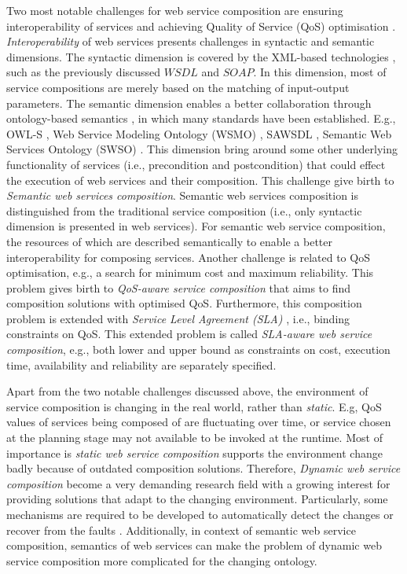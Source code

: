 Two most notable challenges for web service composition are ensuring interoperability of services and achieving Quality of Service (QoS) optimisation \cite{fensel2011semantic}. \emph{Interoperability} of web services presents challenges in syntactic and semantic dimensions. The syntactic dimension is covered by the XML-based technologies \cite{yu2008deploying}, such as the previously discussed $WSDL$ and $SOAP$. In this dimension, most of service compositions are merely based on the matching of input-output parameters. The semantic dimension enables a better collaboration through ontology-based semantics \cite{o2005review}, in which many standards have been established. E.g., OWL-S \cite{martin2004owl}, Web Service Modeling Ontology (WSMO) \cite{lausen2005w3c}, SAWSDL \cite{kopecky2007sawsdl}, Semantic Web Services Ontology (SWSO) \cite{petrie2016web}. This dimension bring around some other underlying functionality of services (i.e., precondition and postcondition) that could effect the execution of web services and their composition. This challenge give birth to \emph{Semantic web services composition}. Semantic web services composition is distinguished from the traditional service composition (i.e., only syntactic dimension is presented in web services). For semantic web service composition,  the resources of which are described semantically to enable a better interoperability for composing services. Another challenge is related to QoS optimisation, e.g., a search for minimum cost and maximum reliability. This problem gives birth to \emph{QoS-aware service composition} that aims to find composition solutions with optimised QoS. Furthermore, this composition problem is extended with \emph{Service Level Agreement (SLA)} \cite{sahai2002automated}, i.e., binding constraints on QoS. This extended problem is called \emph{SLA-aware web service composition}, e.g., both lower and upper bound as constraints on cost, execution time, availability and reliability are separately specified.



Apart from the two notable challenges discussed above, the environment of service composition is changing in the real world, rather than \emph{static}. E.g, QoS values of services being composed of are fluctuating over time, or service chosen at the planning stage may not available to be invoked at the runtime. Most of importance is \emph{static web service composition} supports the environment change badly because of outdated composition solutions. Therefore, \emph{Dynamic web service composition} become a very demanding research field with a growing interest for providing solutions that adapt to the changing environment. Particularly, some mechanisms are required to be developed to automatically detect the changes or recover from the faults \cite{chan2009fault}. Additionally, in context of semantic web service composition, semantics of web services can make the problem of dynamic web service composition more complicated for the changing ontology.


